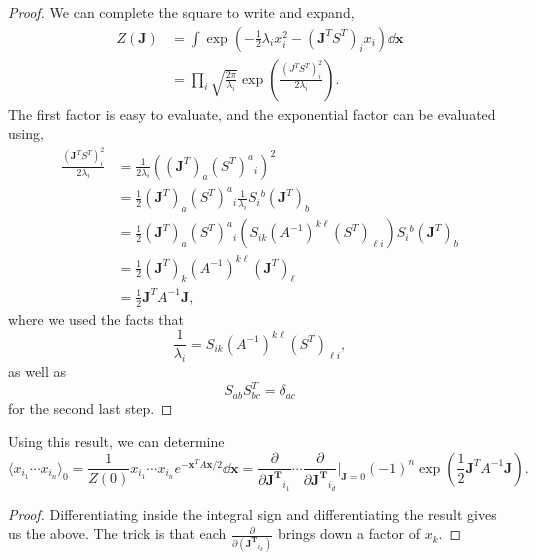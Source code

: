 \documentclass{article}
\numberwithin{equation}{section}
\begin{document}
\begin{proof}
    We can complete the square to write and expand,
    \begin{align}
        Z(\bm{J}) &= \int \exp\left(-\frac{1}{2}\lambda_i x_i^2 - (\bm{J}^TS^T)_i x_i\right) \dd{\bm{x}} \\ 
        &= \prod_{i}\sqrt{\frac{2\pi}{\lambda_i}}\exp\left(\frac{(J^TS^T)_i^2}{2\lambda_i}\right).
    \end{align}
    The first factor is easy to evaluate, and the exponential factor can be evaluated using,
    \begin{align}
        \frac{(\bm{J}^TS^T)_i^2}{2\lambda_i} &= \frac{1}{2 \lambda_i}\left((\bm{J}^T)_a(S^T)^{a}{}_i\right)^2 \\ 
        &= \frac{1}{2}(\bm{J}^T)_a(S^T)^{a}{}_i \frac{1}{\lambda_i} S_{i}{}^b(\bm{J}^T)_{b} \\ 
        &= \frac{1}{2}(\bm{J}^T)_a(S^T)^{a}{}_i \left(S_{ik}(A^{-1})^{k\ell}(S^T)_{\ell i}\right) S_{i}{}^b(\bm{J}^T)_{b} \\ 
        &= \frac{1}{2}(\bm{J}^T)_k (A^{-1})^{k\ell} (\bm{J}^T)_{\ell} \\
        &= \frac{1}{2}\bm{J}^T A^{-1}\bm{J},
    \end{align}
    where we used the facts that 
    \begin{equation}
        \frac{1}{\lambda_i} = S_{ik}(A^{-1})^{k\ell}(S^T)_{\ell i},
    \end{equation}
    as well as 
    \begin{equation}
        S_{ab}S_{bc}^T = \delta_{ac}
    \end{equation}
    for the second last step.
\end{proof}
Using this result, we can determine 
\begin{equation}
    \boxed{\langle x_{i_1}\cdots x_{i_n}\rangle_0 = \frac{1}{Z(0)}x_{i_1}\cdots x_{i_n}e^{-\bm{x}^TA\bm{x}/2}\dd{\bm{x}} = \frac{\partial}{\partial \bm{J^T}_{i_1}}\cdots \frac{\partial}{\partial \bm{J^T}_{i_d}} \bigg|_{\bm{J}=0} (-1)^n \exp\left(\frac{1}{2}\bm{J}^TA^{-1}\bm{J}\right).}
\end{equation}
\begin{proof}
    Differentiating inside the integral sign and differentiating the result gives us the above. The trick is that each $\frac{\partial}{\partial (\bm{J^T}_{i_k})}$ brings down a factor of $x_k.$
\end{proof}
\end{document}
